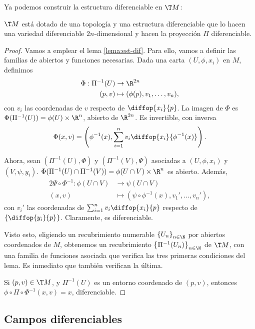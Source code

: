 Ya podemos construir la estructura diferenciable en $\T M$:
\begin{nprop} \label{prop:est-dif-tan}
  $\T M$ está dotado de una topología y una estructura diferenciable que lo
  hacen una variedad diferenciable $2n$-dimensional y hacen la proyección $\Pi$ diferenciable.
\end{nprop}
\begin{proof}
  Vamos a emplear el lema \ref{lema:est-dif}. Para ello, vamos a definir las
  familias de abiertos y funciones necesarias. Dada una carta $(U,\phi,x_{i})$ en $M$,
  definimos
  \begin{alignat*}{2}
    \Phi: \Pi^{-1}(U) & \to \R^{2n} \\
   (p,v) & \mapsto (\phi(p), v_{1}, \dots, v_{n}),
  \end{alignat*}
  con $v_{i}$ las coordenadas de $v$ respecto de $\diffop{x_i}{p}$. La imagen de
  $\Phi$ es $\Phi(\Pi^{-1}(U)) = \phi(U)\times \R^{n}$, abierto de $\R^{2n}$.
  Es invertible, con inversa
  \[
    \Phi(x,v) = \left(\phi^{-1}(x), \sum_{i=1}^{n}v_{i} \diffop{x_{i}}{\phi^{-1}(x)}\right)
    .\]

  Ahora, sean $(\Pi^{-1}(U),\Phi)$ y $(\Pi^{-1}(V),\Psi)$ asociadas a
  $(U,\phi,x_{i})$ y $(V,\psi,y_{i})$. $\Phi(\Pi^{-1}(U)\cap\Pi^{-1}(V)) =
  \phi(U\cap V)\times \R^{n}$ es abierto. Además,
  \begin{alignat*}{2}
    \Psi\circ\Phi^{-1}: \phi(U\cap V) & \to \psi(U\cap V) \\
   (x,v) & \mapsto (\psi\circ\phi^{-1}(x), v_{1}',\dots,v_{n}'),
  \end{alignat*}
  con $v_{i}'$ las coordenadas de $\sum_{i=1}^{n}v_{i}\diffop{x_{i}}{p}$
  respecto de $\left\{ \diffop{y_{i}}{p} \right\}$. Claramente, es diferenciable.

  Visto esto, eligiendo un recubrimiento numerable $\left\{ U_{n}
  \right\}_{n\in\N}$ por abiertos coordenados de $M$, obtenemos un recubrimiento
  $\left\{ \Pi^{-1}(U_{n}) \right\}_{n\in\N}$ de $\T M$, con una familia de
  funciones asociada que verifica las tres primeras condiciones del lema. Es
  inmediato que también verifican la última.

  Si $(p,v)\in \T M$, y $\Pi^{-1}(U)$ es un entorno coordenado de $(p,v)$,
  entonces $\phi\circ\Pi\circ\Phi^{-1}(x,v) = x$, diferenciable.
\end{proof}

\subsection{Campos diferenciables}

